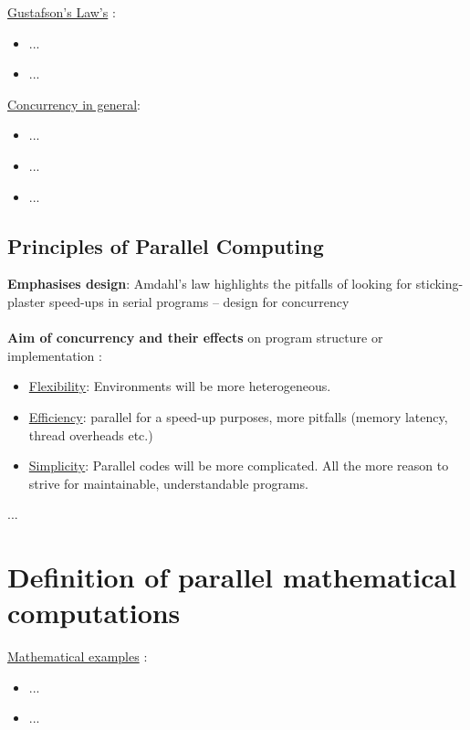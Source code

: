 \underline{Gustafson’s Law's} \parencite{inbook1}:
\begin{itemize}
	\item ...\parencite[see][p81]{inbook1}
	\item ...\parencite[see][p87]{inbook1}\\
\end{itemize}

\underline{Concurrency in general}:
\begin{itemize}
	\item ...\parencite[see][p3]{internet1}
	\item ...\parencite[see][p3]{internet2}
	\item ...
\end{itemize}

\newpage

\subsection{Principles of Parallel Computing}

\textbf{Emphasises design}:
Amdahl's law highlights the pitfalls of looking for
sticking-plaster speed-ups in serial programs –
design for concurrency \parencite[see][p4]{article6}
\\\\\textbf{Aim of concurrency and their effects} on program structure or implementation \parencite[see][p5]{article6}:
\begin{itemize}
  \item \underline{Flexibility}: Environments will be more heterogeneous.
  \item \underline{Efficiency}:	parallel for a speed-up purposes, more pitfalls (memory latency, thread overheads etc.)
  \item \underline{Simplicity}:	Parallel codes will be more complicated. All the more reason to strive for maintainable, understandable programs.\\
\end{itemize}
...\parencite[see][p11 ff.]{article6}

\newpage

\section{Definition of parallel mathematical computations}

\underline{Mathematical examples} \parencite{inbook1}:
\begin{itemize}
	\item ...\parencite[see][p8]{internet1}
	\item ...\parencite[see][p4]{internet2}
\end{itemize}

